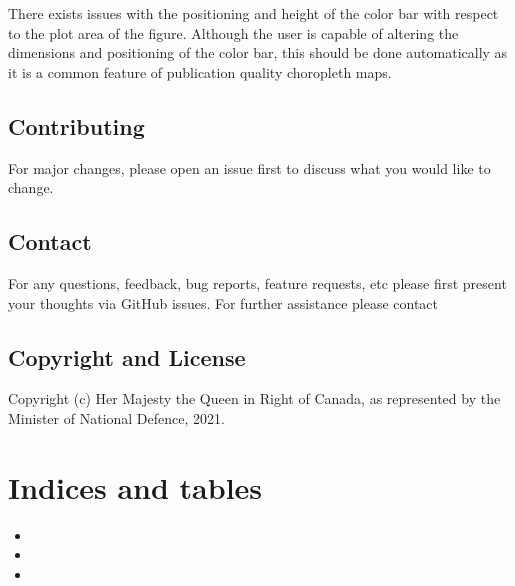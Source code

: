 \documentclass[letterpaper,10pt,english]{sphinxmanual}
\begin{document}
\sphinxAtStartPar
There exists issues with the positioning and height of the color bar
with respect to the plot area of the figure. Although the user is
capable of altering the dimensions and positioning of the color bar,
this should be done automatically as it is a common feature of
publication quality choropleth maps.


\section{Contributing}
\label{\detokenize{index:contributing}}
\sphinxAtStartPar
For major changes, please open an issue first to discuss what you would
like to change.


\section{Contact}
\label{\detokenize{index:contact}}
\sphinxAtStartPar
For any questions, feedback, bug reports, feature requests, etc please
first present your thoughts via GitHub issues. For further assistance
please contact 


\section{Copyright and License}
\label{\detokenize{index:copyright-and-license}}
\sphinxAtStartPar
Copyright (c) Her Majesty the Queen in Right of Canada, as represented
by the Minister of National Defence, 2021.


\chapter{Indices and tables}
\label{\detokenize{index:indices-and-tables}}\begin{itemize}
\item {} 
\sphinxAtStartPar
{}

\item {} 
\sphinxAtStartPar
{}

\item {} 
\sphinxAtStartPar
{}

\end{itemize}
\end{document}
